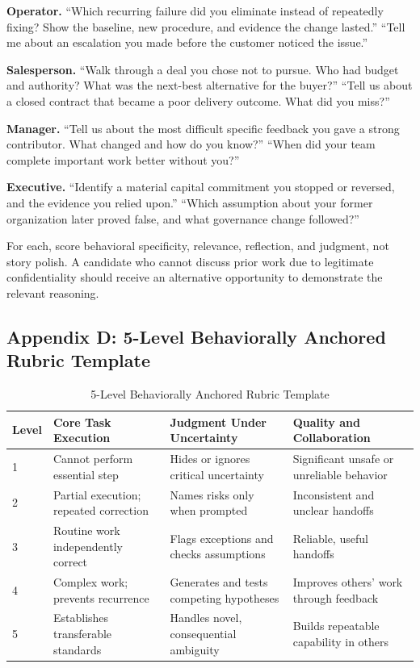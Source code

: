 \textbf{Operator.} ``Which recurring failure did you eliminate instead of repeatedly fixing? Show the baseline, new procedure, and evidence the change lasted.'' ``Tell me about an escalation you made before the customer noticed the issue.''

\textbf{Salesperson.} ``Walk through a deal you chose not to pursue. Who had budget and authority? What was the next-best alternative for the buyer?'' ``Tell us about a closed contract that became a poor delivery outcome. What did you miss?''

\textbf{Manager.} ``Tell us about the most difficult specific feedback you gave a strong contributor. What changed and how do you know?'' ``When did your team complete important work better without you?''

\textbf{Executive.} ``Identify a material capital commitment you stopped or reversed, and the evidence you relied upon.'' ``Which assumption about your former organization later proved false, and what governance change followed?''

For each, score behavioral specificity, relevance, reflection, and judgment, not story polish. A candidate who cannot discuss prior work due to legitimate confidentiality should receive an alternative opportunity to demonstrate the relevant reasoning.

\subsection*{Appendix D: 5-Level Behaviorally Anchored Rubric Template}

\begin{table}[t]
\centering
\small
\caption{5-Level Behaviorally Anchored Rubric Template}
\label{tab:five_level_anchored_rubric}
\begin{tabularx}{\textwidth}{p{1.2cm} p{4.6cm} p{4.6cm} p{4.6cm}}
\toprule
\textbf{Level} & \textbf{Core Task Execution} & \textbf{Judgment Under Uncertainty} & \textbf{Quality and Collaboration} \\
\midrule
1 & Cannot perform essential step & Hides or ignores critical uncertainty & Significant unsafe or unreliable behavior \\
2 & Partial execution; repeated correction & Names risks only when prompted & Inconsistent and unclear handoffs \\
3 & Routine work independently correct & Flags exceptions and checks assumptions & Reliable, useful handoffs \\
4 & Complex work; prevents recurrence & Generates and tests competing hypotheses & Improves others' work through feedback \\
5 & Establishes transferable standards & Handles novel, consequential ambiguity & Builds repeatable capability in others \\
\bottomrule
\end{tabularx}
\end{table}

